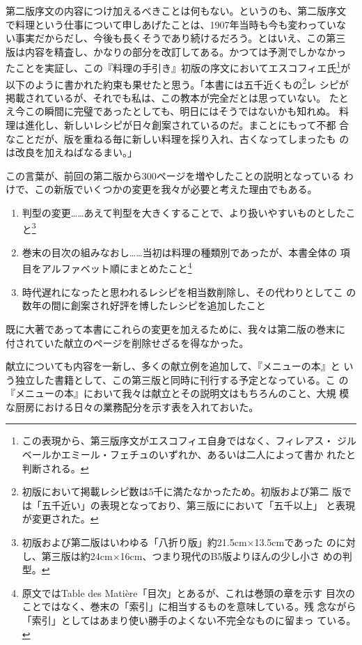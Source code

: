 第二版序文の内容につけ加えるべきことは何もない。というのも、第二版序文
で料理という仕事について申しあげたことは、1907年当時も今も変わっていな
い事実だからだし、今後も長くそうであり続けるだろう。とはいえ、この第三
版は内容を精査し、かなりの部分を改訂してある。かつては予測でしかなかっ
たことを実証し、この『料理の手引き』初版の序文においてエスコフィエ氏\footnote{この表現から、第三版序文がエスコフィエ自身ではなく、フィレアス・
  ジルベールかエミール・フェチュのいずれか、あるいは二人によって書か
  れたと判断される。}が
以下のように書かれた約束も果せたと思う。「本書には五千近くもの\footnote{初版において掲載レシピ数は5千に満たなかったため。初版および第二
  版では「五千近い」の表現となっており、第三版ににおいて「五千以上」
  と表現が変更された。}レ
シピが掲載されているが、それでも私は、この教本が完全だとは思っていない。
たとえ今この瞬間に完璧であったとしても、明日にはそうではないかも知れぬ。
料理は進化し、新しいレシピが日々創案されているのだ。まことにもって不都
合なことだが、版を重ねる毎に新しい料理を採り入れ、古くなってしまったも
のは改良を加えねばなるまい。」

この言葉が、前回の第二版から300ページを増やしたことの説明となっている
わけで、この新版でいくつかの変更を我々が必要と考えた理由でもある。

\begin{enumerate}
\def\labelenumi{\arabic{enumi}.}
\item
  判型の変更\ldots{}\ldots{}あえて判型を大きくすることで、より扱いやすいものとしたこと\footnote{初版および第二版はいわゆる「八折り版」約21.5cm×13.5cmであった
    のに対し、第三版は約24cm×16cm、つまり現代のB5版よりほんの少し小さ
    めの判型。}
\item
  巻末の目次の組みなおし\ldots{}\ldots{}当初は料理の種類別であったが、本書全体の
  項目をアルファベット順にまとめたこと\footnote{原文ではTable des
    Matière「目次」とあるが、これは巻頭の章を示す
    目次のことではなく、巻末の「索引」に相当するものを意味している。残
    念ながら「索引」としてはあまり使い勝手のよくない不完全なものに留まっ
    ている。}
\item
  時代遅れになったと思われるレシピを相当数削除し、その代わりとしてこ
  の数年の間に創案され好評を博したレシピを追加したこと
\end{enumerate}

既に大著であって本書にこれらの変更を加えるために、我々は第二版の巻末に
付されていた献立のページを削除せざるを得なかった。

献立についても内容を一新し、多くの献立例を追加して、『メニューの本』と
いう独立した書籍として、この第三版と同時に刊行する予定となっている。こ
の『メニューの本』において我々は献立とその説明文はもちろんのこと、大規
模な厨房における日々の業務配分を示す表を入れておいた。

